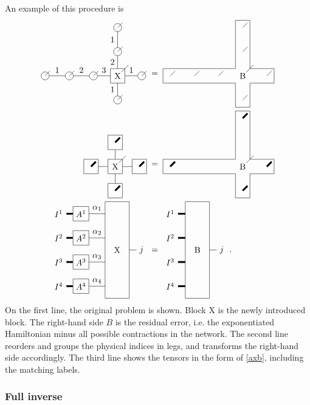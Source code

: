 \def \blockct { \begin{tikzpicture}[baseline=3]
        \draw (0,2.5)-- (0,-1.5) -- (1,-1.5)-- (1,2.5) -- cycle;

        \node[draw=none] (x)  at (0.5,0.5) {B};

        \draw[line width=0.75mm] (-0.3,2)  node [left] {$I^1$}  -- (0,2) ;
        \draw[line width=0.75mm] (-0.3,1)  node [left] {$I^2$} -- (0,1);
        \draw[line width=0.75mm] (-0.3,0)  node [left] {$I^3$} -- (0,0);
        \draw[line width=0.75mm] (-0.3,-1)  node [left] {$I^4$} -- (0,-1);

        \draw (1,0.5) -- (1.3,0.5)  node [right] {$j$} ;

    \end{tikzpicture} }

An example of this procedure is
\begin{align}
    \pepoat                 \; & =  \;\blockat                                     \\
    \pepobt                 \; & =  \;\blockbt                                     \\
    \vcenter{\hbox{ \pepoct }} & =\vcenter{\hbox{  \blockct }} . \label{extract_x}
\end{align}
On the first line, the original problem is shown. Block X is the newly introduced block. The right-hand side $B$ is the residual error, i.e. the exponentiated Hamiltonian minus all possible contractions in the network. The second line reorders and groups the physical indices in legs, and transforms the right-hand side accordingly. The third line shows the tensors in the form of \cref{axb}, including the matching labels.

\subsubsection{Full inverse}

